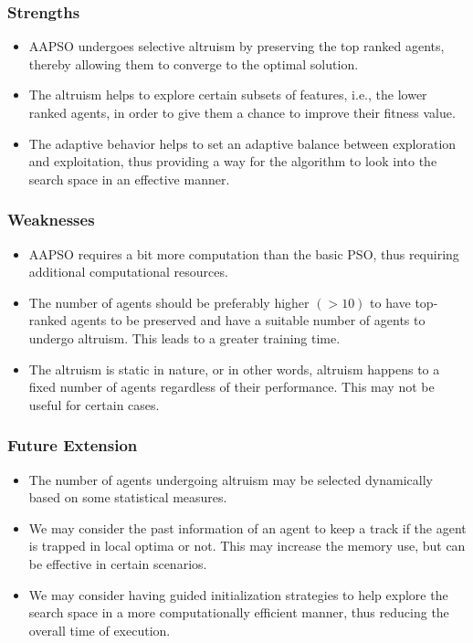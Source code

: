 \documentclass[final,3p,times]{elsarticle}
\begin{document}
\subsubsection{Strengths}
{
\begin{itemize}
    \item AAPSO undergoes selective altruism by preserving the top ranked agents, thereby allowing them to converge to the optimal solution.
    \item The altruism helps to explore certain subsets of features, i.e., the lower ranked agents, in order to give them a chance to improve their fitness value.
    \item The adaptive behavior helps to set an adaptive balance between exploration and exploitation, thus providing a way for the algorithm to look into the search space in an effective manner.
\end{itemize}}
\subsubsection{Weaknesses}
{
\begin{itemize}
    \item AAPSO requires a bit more computation than the basic PSO, thus requiring additional computational resources.
    \item The number of agents should be preferably higher $(>10)$ to have top-ranked agents to be preserved and have a suitable number of agents to undergo altruism. This leads to a greater training time.
    \item The altruism is static in nature, or in other words, altruism happens to a fixed number of agents regardless of their performance. This may not be useful for certain cases.  
\end{itemize}
}
\subsubsection{Future Extension}
{\begin{itemize}
    \item The number of agents undergoing altruism may be selected dynamically based on some statistical measures.
    \item We may consider the past information of an agent to keep a track if the agent is trapped in local optima or not. This may increase the memory use, but can be effective in certain scenarios.
    \item We may consider having guided initialization strategies to help explore the search space in a more computationally efficient manner, thus reducing the overall time of execution.
\end{itemize}}
\end{document}
